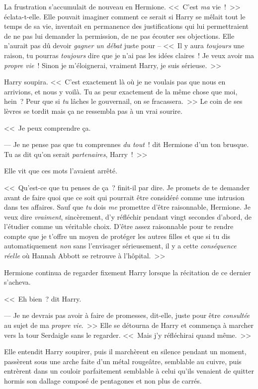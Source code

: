 La frustration s'accumulait de nouveau en Hermione. <<~C'est \emph{ma} vie~!~>> éclata-t-elle. Elle pouvait imaginer comment ce serait si Harry se mêlait tout le temps de sa vie, inventait en permanence des justifications qui lui permettraient de ne pas lui demander la permission, de ne pas écouter ses objections. Elle n'aurait pas dû devoir \emph{gagner un débat} juste pour -- <<~Il y aura \emph{toujours} une raison, tu pourras \emph{toujours} dire que je n'ai pas les idées claires~! Je veux avoir ma \emph{propre vie}~! Sinon je m'éloignerai, vraiment Harry, je suis sérieuse.~>>

Harry soupira. <<~C'est exactement là où je ne voulais pas que nous en arrivions, et nous y voilà. Tu as peur exactement de la même chose que moi, hein~? Peur que si \emph{tu} lâches le gouvernail, on se fracassera.~>> Le coin de ses lèvres se tordit mais ça ne ressembla pas à un vrai sourire.

<<~Je peux comprendre ça.

--- Je ne pense pas que tu comprennes \emph{du tout}~! dit Hermione d'un ton brusque. Tu as dit qu'on serait \emph{partenaires}, Harry~!~>>

Elle vit que ces mots l'avaient arrêté.

<<~Qu'est-ce que tu penses de ça~? finit-il par dire. Je promets de te demander avant de faire quoi que ce soit qui pourrait être considéré comme une intrusion dans tes affaires. Sauf que \emph{tu} dois \emph{me} promettre d'être raisonnable, Hermione. Je veux dire \emph{vraiment}, sincèrement, d'y réfléchir pendant vingt secondes d'abord, de l'étudier comme un véritable choix. D'être assez raisonnable pour te rendre compte que je t'offre un moyen de protéger les autres filles et que si tu dis automatiquement \emph{non} sans l'envisager sérieusement, il y a cette \emph{conséquence réelle} où Hannah Abbott se retrouve à l'hôpital.~>>

Hermione continua de regarder fixement Harry lorsque la récitation de ce dernier s'acheva.

<<~Eh bien~? dit Harry.

--- Je ne devrais pas avoir à faire de promesses, dit-elle, juste pour être \emph{consultée} au sujet de ma \emph{propre vie}.~>> Elle se détourna de Harry et commença à marcher vers la tour Serdaigle sans le regarder. <<~Mais j'y réfléchirai quand même.~>>

Elle entendit Harry soupirer, puis il marchèrent en silence pendant un moment, passèrent sous une arche faite d'un métal rougeâtre, semblable au cuivre, puis entrèrent dans un couloir parfaitement semblable à celui qu'ils venaient de quitter hormis son dallage composé de pentagones et non plus de carrés.

